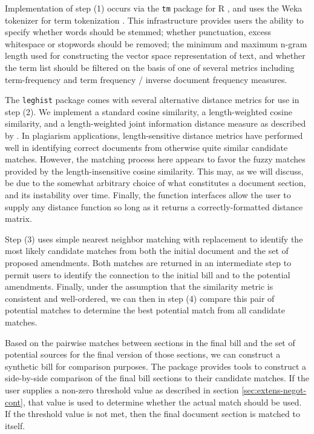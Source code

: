 \documentclass[11pt]{article}
\begin{document}
Implementation of step (1) occurs via the \texttt{tm} package for R \citep{meyer2008text},
and uses the Weka tokenizer for term
tokenization \citep{hall2009weka}. This infrastructure provides users the ability to
specify whether words should be stemmed; whether punctuation, excess
whitespace or stopwords should be
removed; the minimum and maximum n-gram length used for constructing the vector space
representation of text, and whether the term list should be filtered
on the basis of one of several metrics including term-frequency and
term frequency / inverse document frequency measures. 

The \texttt{leghist} package comes with several alternative distance metrics for use
in step (2). We implement a standard cosine similarity, a
length-weighted cosine similarity, and a length-weighted joint
information distance measure as described by \cite{hoad2003methods}. In plagiarism applications, length-sensitive
distance metrics have performed well in identifying correct documents
from otherwise quite similar candidate matches. However,
the matching process here appears to favor the fuzzy matches provided
by the length-insensitive cosine similarity. This may, as we will discuss, be due to the
somewhat arbitrary choice of what constitutes a document section, and
its instability over time. Finally, the function interfaces allow the
user to supply any distance function so long as it returns a
correctly-formatted distance matrix. 

Step (3) uses simple nearest neighbor matching with replacement to
identify the most likely candidate matches from both the initial
document and the set of proposed amendments. Both matches are returned in an
intermediate step to permit users to identify the connection to the
initial bill and to the potential amendments. Finally, under the
assumption that the similarity metric is consistent and well-ordered, we can then in step (4) compare
this pair of potential matches to determine the best potential match
from all candidate matches. 

Based on the pairwise matches between sections in the final bill and
the set of potential sources for the final version of those sections,
we can construct a synthetic bill for comparison purposes. The package
provides tools to construct a side-by-side comparison of the final
bill sections to their candidate matches. If the user supplies a
non-zero threshold value as described in section
\ref{sec:extens-negot-cont}, that
value is used to determine whether the actual match
should be used. If the threshold value is not met, then the final
document section is matched to itself. 
\end{document}

